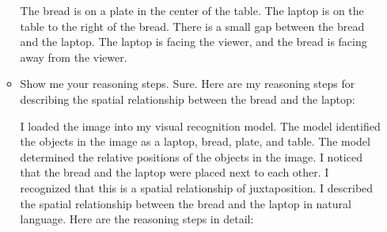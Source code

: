 \begin{enumerate}
\begin{itemize}
        The bread is on a plate in the center of the table.
        The laptop is on the table to the right of the bread.
        There is a small gap between the bread and the laptop.
        The laptop is facing the viewer, and the bread is facing away from the viewer.
        \item Show me your reasoning steps.
        \subitem 
        Sure. Here are my reasoning steps for describing the spatial relationship between the bread and the laptop:

        I loaded the image into my visual recognition model.
        The model identified the objects in the image as a laptop, bread, plate, and table.
        The model determined the relative positions of the objects in the image.
        I noticed that the bread and the laptop were placed next to each other.
        I recognized that this is a spatial relationship of juxtaposition.
        I described the spatial relationship between the bread and the laptop in natural language.
        Here are the reasoning steps in detail:


\end{itemize}
\end{enumerate}
